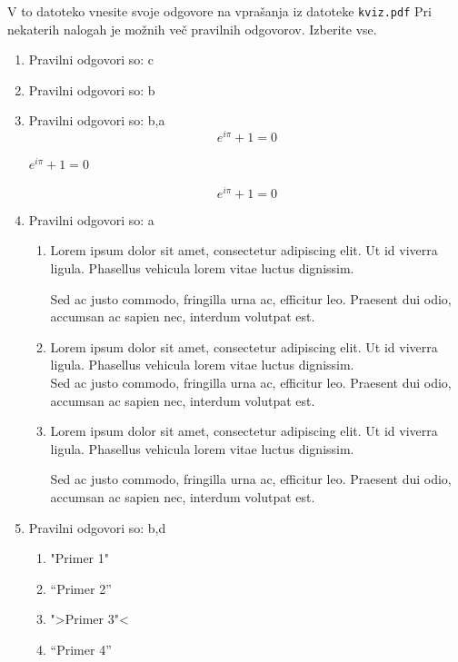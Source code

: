 \documentclass[11pt]{article}
\begin{document}
V to datoteko vnesite svoje odgovore na vprašanja iz datoteke \texttt{kviz.pdf}
Pri nekaterih nalogah je možnih več pravilnih odgovorov. Izberite vse.

\begin{enumerate}
    \item Pravilni odgovori so: c %
    
    \item Pravilni odgovori so: b %
    
    \item Pravilni odgovori so: b,a %
      \[ e^{i \pi} + 1 = 0 \]
      \begin{center}
          \( e^{i \pi} + 1 = 0 \)
      \end{center}
      \begin{equation*}
          e^{i \pi} + 1 = 0
      \end{equation*}

    \item Pravilni odgovori so: a%
        \begin{enumerate}
            \item {
Lorem ipsum dolor sit amet, consectetur adipiscing 
elit. Ut id viverra ligula. Phasellus vehicula lorem 
vitae luctus dignissim. 
                
Sed ac justo commodo, fringilla urna ac, efficitur 
leo. Praesent dui odio, accumsan ac sapien nec, 
interdum volutpat est. 
            }
            \item {
Lorem ipsum dolor sit amet, consectetur adipiscing 
elit. Ut id viverra ligula. Phasellus vehicula lorem 
vitae luctus dignissim. \\
Sed ac justo commodo, fringilla urna ac, efficitur 
leo. Praesent dui odio, accumsan ac sapien nec, 
interdum volutpat est.             }
            \item {
Lorem ipsum dolor sit amet, consectetur adipiscing 
elit. Ut id viverra ligula. Phasellus vehicula lorem 
vitae luctus dignissim. \par
Sed ac justo commodo, fringilla urna ac, efficitur 
leo. Praesent dui odio, accumsan ac sapien nec, 
interdum volutpat est.             }
        \end{enumerate}
    
      \item Pravilni odgovori so: b,d%
        \begin{enumerate}
          \item "Primer 1"
          \item ``Primer 2''
          \item ">Primer 3"<
          \item "`Primer 4"'
        \end{enumerate}


\end{enumerate}
\end{document}
